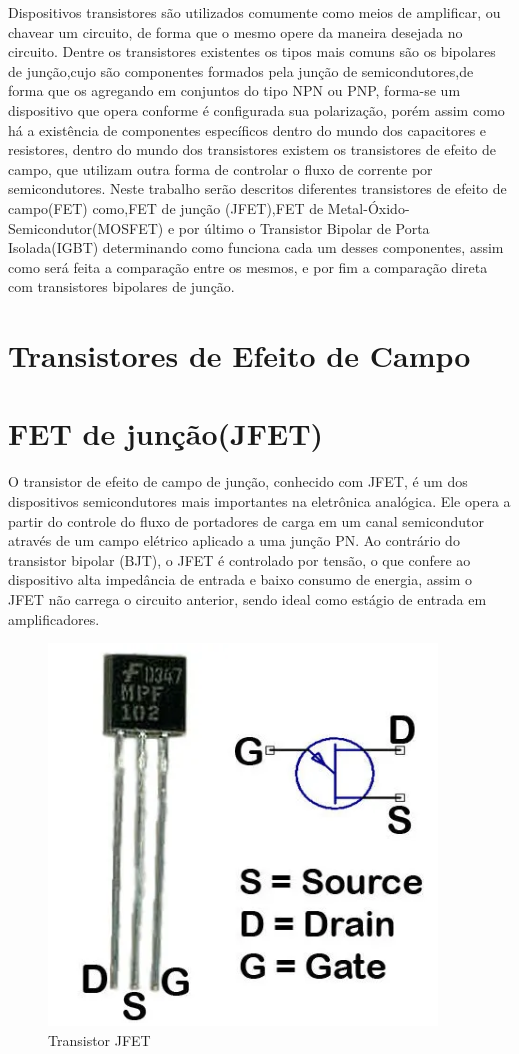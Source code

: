 \documentclass[12pt]{article}
\begin{document}
    Dispositivos transistores são utilizados comumente como meios de amplificar, ou chavear um circuito, de forma que o mesmo opere da maneira desejada no circuito. Dentre os transistores existentes os tipos mais comuns são os bipolares de junção,cujo são componentes formados pela junção de semicondutores,de forma que os agregando em conjuntos do tipo NPN ou PNP, forma-se um dispositivo que opera conforme é configurada sua polarização, porém assim como há a existência de componentes específicos dentro do mundo dos capacitores e resistores, dentro do mundo dos transistores existem os transistores de efeito de campo, que utilizam outra forma de controlar o fluxo de corrente por semicondutores. Neste trabalho serão descritos diferentes transistores de efeito de campo(FET) como,FET de junção (JFET),FET de Metal-Óxido-Semicondutor(MOSFET) e por último o Transistor Bipolar de Porta Isolada(IGBT) determinando como funciona cada um desses componentes, assim como será feita a comparação entre os mesmos, e por fim a comparação direta com transistores bipolares de junção.

\newpage

\section{Transistores de Efeito de Campo}

\section{FET de junção(JFET)}

O transistor de efeito de campo de junção, conhecido com JFET, é um dos dispositivos semicondutores mais importantes na eletrônica analógica. Ele opera a partir do controle do fluxo de portadores de carga em um canal semicondutor através de um campo elétrico aplicado a uma junção PN. Ao contrário do transistor bipolar (BJT), o JFET é controlado por tensão, o que confere ao dispositivo alta impedância de entrada e baixo consumo de energia, assim o JFET não carrega o circuito anterior, sendo ideal como estágio de entrada em amplificadores.

        \begin{figure}[htpb!]
            \centering
            \includegraphics[width=0.3\linewidth]{images/Captura de tela 2025-10-18 223003.png}
            \caption{Transistor JFET}
        \end{figure}
\end{document}
